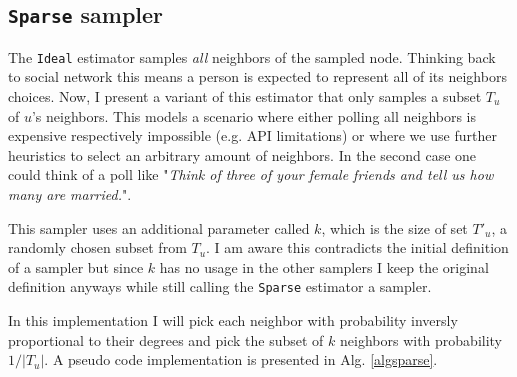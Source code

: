 \subsection{\texttt{Sparse} sampler}
The \texttt{Ideal} estimator samples \textit{all} neighbors of the sampled node. Thinking back to social network this means a person is expected to represent all of its neighbors choices.
Now, I present a variant of this estimator that only samples a subset $T_u$ of $u$'s neighbors.
This models a scenario where either polling all neighbors is expensive respectively impossible (e.g. API limitations) or where we use further heuristics to select an arbitrary amount of neighbors. In the second case one could think of a poll like "\textit{Think of three of your female friends and tell us how many are married.}".

This sampler uses an additional parameter called $k$, which is the size of set $T'_u$, a randomly chosen subset from $T_u$.
I am aware this contradicts the initial definition of a sampler but since $k$ has no usage in the other samplers I keep the original definition anyways while still calling the \texttt{Sparse} estimator a sampler.

In this implementation I will pick each neighbor with probability inversly proportional to their degrees and pick the subset of $k$ neighbors with probability $1/|T_u|$.
A pseudo code implementation is presented in Alg. \ref{algsparse}.

